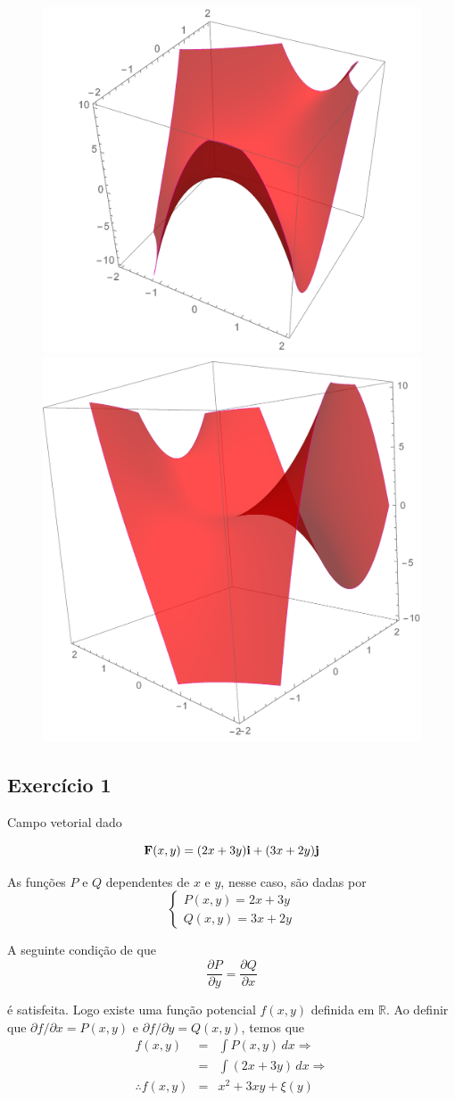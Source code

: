 \documentclass[a4paper, 12pt, brazilian]{article}
\begin{document}
	\begin{figure}[H]
		\centering
		\includegraphics[width=.5\linewidth]{images/ex4_3d1}
		\includegraphics[width=.4\linewidth]{images/ex4_3d2}
	\end{figure}
	\subsection{Exercício 1}
	
	Campo vetorial dado
	
	\begin{equation}
		\textbf{F} (x,y)=(2x+3y)\textbf{i}+(3x+2y)\textbf{j}
	\end{equation}
	
	As funções $P$ e $Q$ dependentes de $x$ e $y$, nesse caso, são dadas por
	$$
		\begin{cases}
			P(x,y)=2x+3y\\	
			Q(x,y)=3x+2y
		\end{cases}
	$$
	
	A seguinte condição de que
	\begin{equation}
		\dfrac{\partial P}{\partial y}=\dfrac{\partial Q}{\partial x}
	\end{equation}
	
	é satisfeita. Logo existe uma função potencial $f(x,y)$ definida em $\mathbb{R}$. Ao definir que $\partial f/\partial x=P(x,y)$ e $\partial f/\partial y=Q(x,y)$, temos que
	\begin{eqnarray}
		f(x,y)&=&\int P(x,y)\,dx\Rightarrow\\
		&=&\int(2x+3y)\,dx\Rightarrow\\
		\therefore f(x,y)&=&x^{2}+3xy+\xi(y)\label{eq:f1}
	\end{eqnarray}
	
\end{document}
